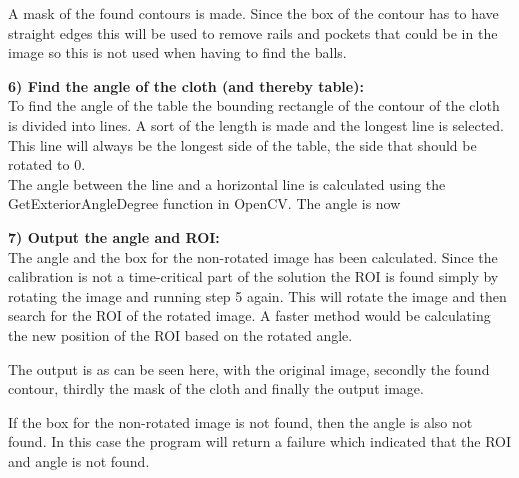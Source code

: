 A mask of the found contours is made. Since the box of the contour has to have straight edges this will be used to remove rails and pockets that could be in the image so this is not used when having to find the balls.

\begin{figure}[H]
\centering
{}
\label{myfigure}
\caption{}
\end{figure}

\textbf{6) Find the angle of the cloth (and thereby table):}\\
To find the angle of the table the bounding rectangle of the contour of the cloth is divided into lines. A sort of the length is made and the longest line is selected. This line will always be the longest side of the table, the side that should be rotated to 0\degree. \\

The angle between the line and a horizontal line is calculated using the GetExteriorAngleDegree function in OpenCV\cite{opencv}. The angle is now 


\textbf{7) Output the angle and ROI:}\\
The angle and the box for the non-rotated image has been calculated. Since the calibration is not a time-critical part of the solution the ROI is found simply by rotating the image and running step 5 again.  This will rotate the image and then search for the ROI of the rotated image. A faster method would be calculating the new position of the ROI based on the rotated angle.

The output is as can be seen here, with the original image, secondly the found contour, thirdly the mask of the cloth and finally the output image.




If the box for the non-rotated image is not found, then the angle is also not found. In this case the program will return a failure which indicated that the ROI and angle is not found. 